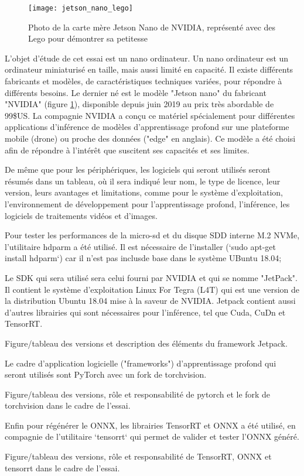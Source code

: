 ﻿
\begin{figure}[H]
    \centering
    \texttt{[image: jetson\_nano\_lego]}
    \caption{Photo de la carte mère Jetson Nano de NVIDIA, représenté avec des Lego pour démontrer sa petitesse}
    \label{fig:jetson_nano_lego}
\end{figure}
\par L'objet d'étude de cet essai est un nano ordinateur. Un nano ordinateur est un ordinateur miniaturisé en taille, mais aussi limité en capacité. Il existe différents fabricants et modèles, de caractéristiques techniques variées, pour répondre à différents besoins. Le dernier né est le modèle "Jetson nano" du fabricant "NVIDIA" (figure \ref{fig:jetson_nano_lego}), disponible depuis juin 2019 au prix très abordable de 99\$US. La compagnie NVIDIA a conçu ce matériel spécialement pour différentes applications d'inférence de modèles d'apprentissage profond sur une plateforme mobile (drone) ou proche des données ("edge" en anglais). Ce modèle a été choisi afin de répondre à l'intérêt que suscitent ses capacités et ses limites. 
\par De même que pour les périphériques, les logiciels qui seront utilisés seront résumés dans un tableau, où il sera indiqué leur nom, le type de licence, leur version, leurs avantages et limitations, comme pour le système d'exploitation, l'environnement de développement pour l'apprentissage profond, l'inférence, les logiciels de traitements vidéos et d'images. 
\par Pour tester les performances de la micro-sd et du disque SDD interne M.2 NVMe, l'utilitaire hdparm a été utilisé. Il est nécessaire de l'installer (`sudo apt-get install hdparm`) car il n'est pas inclusde base dans le système UBuntu 18.04;
\par Le SDK qui sera utilisé sera celui fourni par NVIDIA et qui se nomme "JetPack". Il contient le système d'exploitation Linux For Tegra (L4T) qui est une version de la distribution Ubuntu 18.04 mise à la saveur de NVIDIA. Jetpack contient aussi d'autres librairies qui sont nécessaires pour l'inférence, tel que Cuda, CuDn et TensorRT.
{\color{red} \par Figure/tableau des versions et description des éléments du framework Jetpack. }
\par Le cadre d'application logicielle ("frameworks") d’apprentissage profond qui seront utilisés sont PyTorch avec un fork de torchvision.
{\color{red} \par Figure/tableau des versions, rôle et responsabilité de pytorch et le fork de torchvision dans le cadre de l'essai. }
\par Enfin pour régénérer le ONNX, les librairies TensorRT et ONNX a été utilisé, en compagnie de l'utilitaire `tensorrt` qui permet de valider et tester l'ONNX généré.
{\color{red} \par Figure/tableau des versions, rôle et responsabilité de TensorRT, ONNX et tensorrt dans le cadre de l'essai. }
